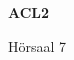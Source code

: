 \documentclass[a4paper]{article}
\begin{document}
\printGenericVSLHeader
\begin{center}
\begin{vsltext}{3cm}{4cm}

   \vspace{0.5cm} 

    \textbf{ACL2} 

    \vspace{1.5cm}

    Hörsaal 7

\end{vsltext}

\end{center}
\end{document}
